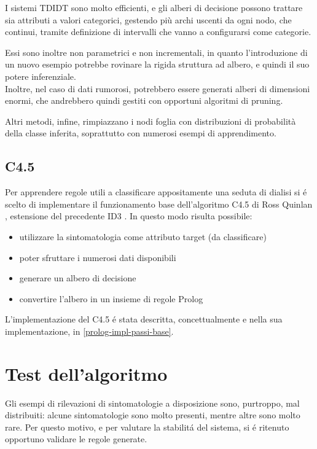 \documentclass[preprint]{acm_proc_article-sp}
\begin{document}
I sistemi TDIDT sono molto efficienti, e gli alberi di decisione possono trattare sia attributi a valori categorici, gestendo più archi uscenti da ogni nodo, che continui, tramite definizione di intervalli che vanno a configurarsi come categorie.

Essi sono inoltre non parametrici e non incrementali, in quanto l'introduzione di un nuovo esempio potrebbe rovinare la rigida struttura ad albero, e quindi il suo potere inferenziale.\\
Inoltre, nel caso di dati rumorosi, potrebbero essere generati alberi di dimensioni enormi, che andrebbero quindi gestiti con opportuni algoritmi di pruning.

Altri metodi, infine, rimpiazzano i nodi foglia con distribuzioni di probabilità della classe inferita, soprattutto con numerosi esempi di apprendimento.

\subsection{C4.5}
Per apprendere regole utili a classificare appositamente una seduta di dialisi si \'e scelto di implementare il funzionamento base dell'algoritmo C4.5 di Ross Quinlan \cite{Quinlan:1993:CPM:583200} \cite{Salzberg:1994:BRC:198277.637825}, estensione del precedente ID3 \cite{Mitchell:1997:ML:541177}. In questo modo risulta possibile:
\begin{itemize}
\item utilizzare la sintomatologia come attributo target (da classificare)
\item poter sfruttare i numerosi dati disponibili
\item generare un albero di decisione
\item convertire l'albero in un insieme di regole Prolog
\end{itemize}

L'implementazione del C4.5 \'e stata descritta, concettualmente e nella sua implementazione, in \ref{prolog-impl-passi-base}.

\section{Test dell'algoritmo}
Gli esempi di rilevazioni di sintomatologie a disposizione sono, purtroppo, mal distribuiti: alcune sintomatologie sono molto presenti, mentre altre sono molto rare.
Per questo motivo, e per valutare la stabilit\'a del sistema, si \'e ritenuto opportuno validare le regole generate.
\end{document}
